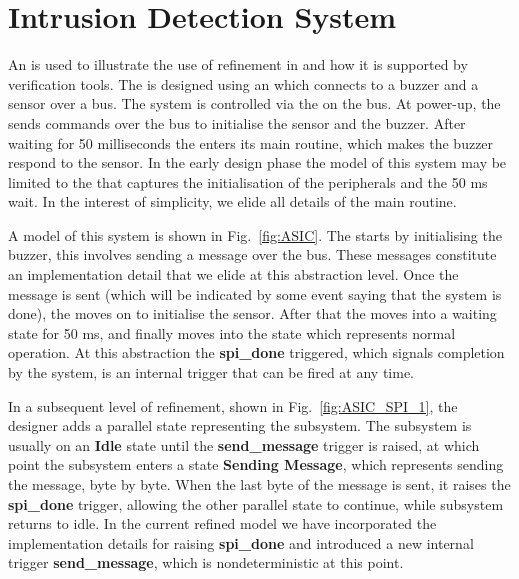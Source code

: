 

\section{Intrusion Detection System}
\label{sec:secbot}

An \IDS is used to illustrate the use of refinement in \statecharts and how it is supported by \EventB verification tools.
The \IDS is designed using an \ASIC which connects to a buzzer and a sensor over a \SPI bus. The system is controlled via the \ASIC on the \SPI bus. At power-up, the \ASIC sends commands over the \SPI bus to initialise the sensor and the buzzer. After waiting for 50 milliseconds the \ASIC enters its main routine, which makes the buzzer respond to the sensor. In the early design phase the \statechart model of this system may be limited to the \ASIC that captures the initialisation of the peripherals and the 50 ms wait. In the interest of simplicity, we elide all details of the main routine.

A \statechart model of this system is shown in Fig.~\ref{fig:ASIC}. The \ASIC starts by initialising the buzzer, this involves sending a message over the \SPI bus. These messages constitute an implementation detail that we elide at this abstraction level. Once the message is sent (which will be indicated by some event saying that the \SPI system is done), the \ASIC moves on to initialise the sensor. After that the \ASIC moves into a waiting state for 50 ms, and finally moves into the state which represents normal operation. At this abstraction the \textbf{spi\_done} triggered, which signals completion by the \SPI system, is an internal trigger that can be fired at any time.

In a subsequent level of refinement, shown in Fig.~\ref{fig:ASIC_SPI_1}, the designer adds a parallel state representing the \SPI subsystem. The \SPI subsystem is usually on an \textbf{Idle} state until the \textbf{send\_message} trigger is raised, at which point the \SPI subsystem enters a state \textbf{Sending Message}, which represents sending the message, byte by byte. When the last byte of the message is sent, it raises the \textbf{spi\_done} trigger, allowing the other parallel state to continue, while \SPI subsystem returns to idle. In the current refined model we have incorporated the implementation details for raising \textbf{spi\_done} and introduced a new internal trigger 
\textbf{send\_message}, which is nondeterministic at this point.

